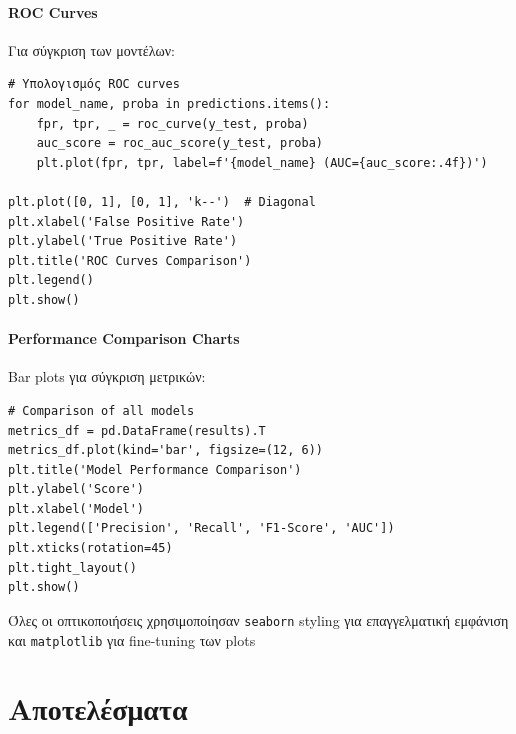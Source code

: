 \documentclass[12pt,a4paper,twoside]{book}
\begin{document}
\subsubsection{ROC Curves}

Για σύγκριση των μοντέλων:

\begin{tcolorbox}[myCustomStyle={ROC Curves Comparison}]
    \begin{lstlisting}[style=myPythonStyle]
# Υπολογισμός ROC curves
for model_name, proba in predictions.items():
    fpr, tpr, _ = roc_curve(y_test, proba)
    auc_score = roc_auc_score(y_test, proba)
    plt.plot(fpr, tpr, label=f'{model_name} (AUC={auc_score:.4f})')

plt.plot([0, 1], [0, 1], 'k--')  # Diagonal
plt.xlabel('False Positive Rate')
plt.ylabel('True Positive Rate')
plt.title('ROC Curves Comparison')
plt.legend()
plt.show()
\end{lstlisting}
\end{tcolorbox}

\subsubsection{Performance Comparison Charts}

Bar plots για σύγκριση μετρικών:

\begin{tcolorbox}[myCustomStyle={Performance Bar Chart}]
    \begin{lstlisting}[style=myPythonStyle]
# Comparison of all models
metrics_df = pd.DataFrame(results).T
metrics_df.plot(kind='bar', figsize=(12, 6))
plt.title('Model Performance Comparison')
plt.ylabel('Score')
plt.xlabel('Model')
plt.legend(['Precision', 'Recall', 'F1-Score', 'AUC'])
plt.xticks(rotation=45)
plt.tight_layout()
plt.show()
\end{lstlisting}
\end{tcolorbox}

Όλες οι οπτικοποιήσεις χρησιμοποίησαν \texttt{seaborn} styling για επαγγελματική εμφάνιση και \texttt{matplotlib} για fine-tuning των plots

\chapter{Αποτελέσματα}
\end{document}
